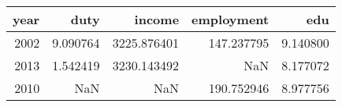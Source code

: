 \begin{tabular}{rrrrr}
\toprule
 year &      duty &       income &  employment &       edu \\
\midrule
 2002 &  9.090764 &  3225.876401 &  147.237795 &  9.140800 \\
 2013 &  1.542419 &  3230.143492 &         NaN &  8.177072 \\
 2010 &       NaN &          NaN &  190.752946 &  8.977756 \\
\bottomrule
\end{tabular}
